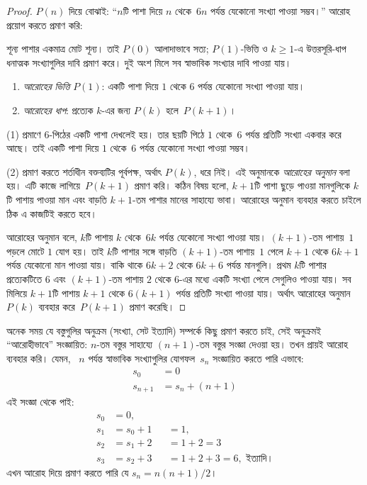 \documentclass[../../../include/open-logic-section]{subfiles}
\begin{document}
\begin{proof}
$P(n)$ দিয়ে বোঝাই: ``$n$টি পাশা দিয়ে $n$ থেকে~$6n$
পর্যন্ত যেকোনো সংখ্যা পাওয়া সম্ভব।'' আরোহ প্রয়োগ করতে
প্রমাণ করি:

\par\smallskip\noindent শূন্য পাশার একমাত্র মোট শূন্য। তাই $P(0)$ আলাদাভাবে সত্য; $P(1)$-ভিত্তি ও $k\geq 1$-এ উত্তরসূরি-ধাপ ধনাত্মক সংখ্যাগুলির দাবি প্রমাণ করে। দুই অংশ মিলে সব স্বাভাবিক সংখ্যার দাবি পাওয়া যায়।
\begin{enumerate}
\item \emph{আরোহের ভিত্তি} $P(1)$: একটি পাশা দিয়ে $1$
  থেকে $6$ পর্যন্ত যেকোনো সংখ্যা পাওয়া যায়।
\item \emph{আরোহের ধাপ}: প্রত্যেক $k$-এর জন্য $P(k)$ হলে~$P(k+1)$।
\end{enumerate}

(1) প্রমাণে $6$-পিঠের একটি পাশা দেখলেই হয়। তার ছয়টি
পিঠে $1$ থেকে~$6$ পর্যন্ত প্রতিটি সংখ্যা একবার করে আছে।
তাই একটি পাশা দিয়ে $1$ থেকে~$6$ পর্যন্ত যেকোনো সংখ্যা
পাওয়া সম্ভব।

(2) প্রমাণ করতে শর্তাধীন বক্তব্যটির পূর্বপক্ষ, অর্থাৎ
$P(k)$, ধরে নিই। এই অনুমানকে \emph{আরোহের অনুমান}
বলা হয়। এটি কাজে লাগিয়ে~$P(k+1)$ প্রমাণ করি। কঠিন
বিষয় হলো, $k+1$টি পাশা ছুড়ে পাওয়া মানগুলিকে $k$টি
পাশায় পাওয়া মান এবং বাড়তি $k+1$-তম পাশার মানের
সাহায্যে ভাবা। আরোহের অনুমান ব্যবহার করতে চাইলে ঠিক
এ কাজটিই করতে হবে।

আরোহের অনুমান বলে, $k$টি পাশায় $k$ থেকে~$6k$ পর্যন্ত
যেকোনো সংখ্যা পাওয়া যায়। $(k+1)$-তম পাশায়~$1$
পড়লে মোটে $1$ যোগ হয়। তাই $k$টি পাশার সঙ্গে বাড়তি
$(k+1)$-তম পাশায়~$1$ পেলে $k+1$ থেকে $6k+1$ পর্যন্ত যেকোনো মান
পাওয়া যায়। বাকি থাকে $6k+2$ থেকে $6k+6$ পর্যন্ত
মানগুলি। প্রথম $k$টি পাশার প্রত্যেকটিতে $6$ এবং
$(k+1)$-তম পাশায় $2$ থেকে $6$-এর মধ্যে একটি সংখ্যা
পেলে সেগুলিও পাওয়া যায়। সব মিলিয়ে $k+1$টি পাশায়
$k+1$ থেকে $6(k+1)$ পর্যন্ত প্রতিটি সংখ্যা পাওয়া যায়।
অর্থাৎ আরোহের অনুমান~$P(k)$ ব্যবহার করে~$P(k+1)$
প্রমাণ করেছি।
\end{proof}

অনেক সময় যে বস্তুগুলির অনুক্রম (সংখ্যা, সেট ইত্যাদি)
সম্পর্কে কিছু প্রমাণ করতে চাই, সেই অনুক্রমই ``আরোহীভাবে''
সংজ্ঞায়িত: $n$-তম বস্তুর সাহায্যে $(n+1)$-তম বস্তুর
সংজ্ঞা দেওয়া হয়। তখন প্রায়ই আরোহ ব্যবহার করি। যেমন,
~$n$ পর্যন্ত স্বাভাবিক সংখ্যাগুলির যোগফল~$s_n$ সংজ্ঞায়িত
করতে পারি এভাবে:
\begin{align*}
  s_0 & = 0\\
  s_{n+1} & = s_n + (n+1)
\end{align*}
এই সংজ্ঞা থেকে পাই:
\begin{align*}
  s_0 & = 0,\\
  s_1 & = s_0 + 1 && = 1,\\
  s_2 & = s_1 + 2 && = 1 + 2 = 3\\
  s_3 & = s_2 + 3 && = 1 + 2 + 3 = 6, \text{ ইত্যাদি।}
\end{align*}
এখন আরোহ দিয়ে প্রমাণ করতে পারি যে $s_n = n(n+1)/2$।
\end{document}
